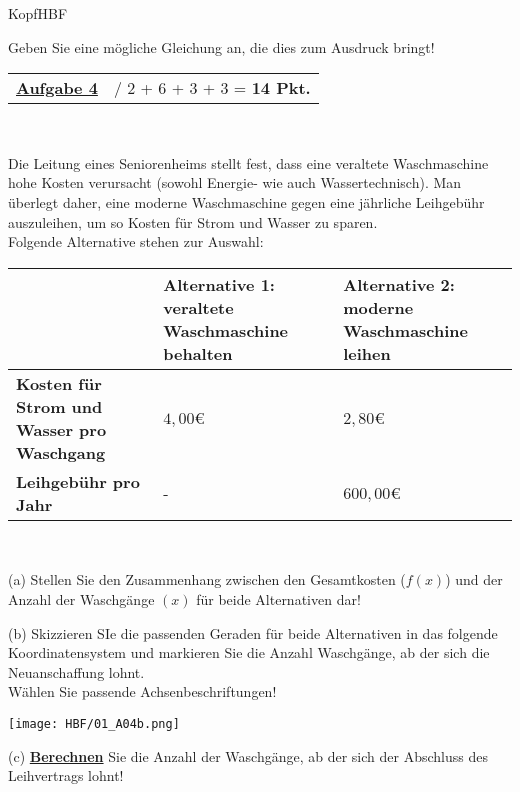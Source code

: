\documentclass[oneside,openany,headings=optiontotoc,11pt,numbers=noenddot]{scrreprt}
\begin{document}
\begin{test}{0.725}{KopfHBF}
\begin{framed}
			Geben Sie eine mögliche Gleichung an, die dies zum Ausdruck bringt!
		\end{framed}
		\begin{framed}
			\noindent
			\begin{tabularx}{\textwidth}{Xl}\underline{\textbf{Aufgabe 4}}& / 2 + 6 + 3 + 3 = \textbf{14 Pkt.}\end{tabularx}\\
			\par\noindent
			Die Leitung eines Seniorenheims stellt fest, dass eine veraltete Waschmaschine hohe Kosten verursacht (sowohl Energie- wie auch Wassertechnisch). Man überlegt daher, eine moderne Waschmaschine gegen eine jährliche Leihgebühr auszuleihen, um so Kosten für Strom und Wasser zu sparen.\\
			Folgende Alternative stehen zur Auswahl:\\
			\par\noindent
			\begin{tabularx}{\textwidth}{|X|X|X|}
				\cline{2-3}
				\multicolumn{1}{l|}{}& \textbf{Alternative 1: veraltete Waschmaschine behalten} & \textbf{Alternative 2: moderne Waschmaschine leihen}\\
				\hline
				\textbf{Kosten für Strom und Wasser pro Waschgang} & \(4,00\)\euro{} & \(2,80\)\euro{}\\
				\hline
				\textbf{Leihgebühr pro Jahr} & - & \(600,00\)\euro{}\\
				\hline
			\end{tabularx}\\
			\par\noindent
			(a) Stellen Sie den Zusammenhang zwischen den Gesamtkosten (\(f(x)\)) und der Anzahl der Waschgänge \((x)\) für beide Alternativen dar!\\
			\par\noindent
			(b) Skizzieren SIe die passenden Geraden für beide Alternativen in das folgende Koordinatensystem und markieren Sie die Anzahl Waschgänge, ab der sich die Neuanschaffung lohnt.\\
			Wählen Sie passende Achsenbeschriftungen!\\
			\par\noindent
			\begin{center}
				\texttt{[image: HBF/01\_A04b.png]}\\
			\end{center}
			\par\noindent
			(c) \underline{\textbf{Berechnen}} Sie die Anzahl der Waschgänge, ab der sich der Abschluss des Leihvertrags lohnt!\\

\end{framed}
\end{test}
\end{document}
